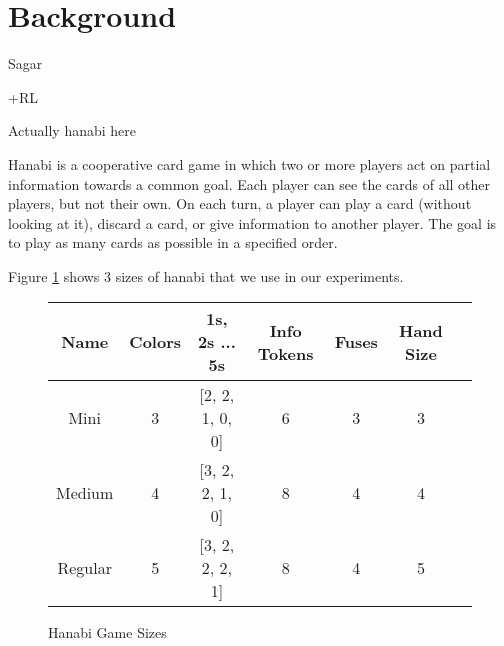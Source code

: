 \section{Background}
\label{background}

Sagar

+RL

Actually hanabi here

Hanabi \cite{hanabiboardgame, hanabiwiki} is a cooperative card game in which two or more players act on partial information towards a common goal. Each player can see the cards of all other players, but not their own. On each turn, a player can play a card (without looking at it), discard a card, or give information to another player. The goal is to play as many cards as possible in a specified order.

Figure \ref{fig:hanabisizes} shows 3 sizes of hanabi that we use in our experiments.

\begin{figure}
    \centering
    \begin{tabular}{|c | c | c | c | c | c | c |} \hline
        Name        & Colors & 1s, 2s ... 5s  & Info Tokens & Fuses & Hand Size \\ \hline
        Mini        & 3      & [2, 2, 1, 0, 0]    & 6           & 3     & 3 \\ \hline
        Medium      & 4      & [3, 2, 2, 1, 0] & 8           & 4     & 4 \\ \hline
        Regular     & 5      & [3, 2, 2, 2, 1] & 8 & 4 & 5 \\ \hline
    \end{tabular}
    \caption{Hanabi Game Sizes}
    \label{fig:hanabisizes}
\end{figure}
